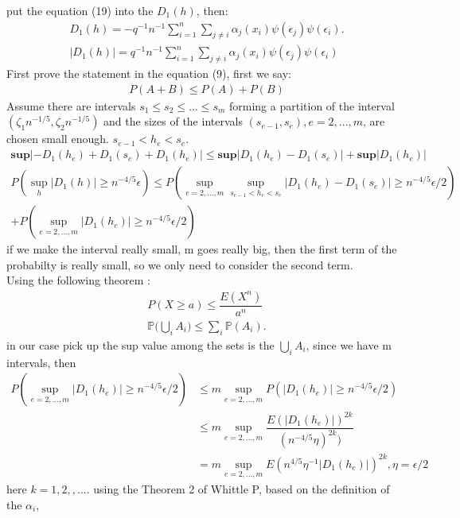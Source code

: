 \documentclass[12pt]{amsart}
\begin{document}
put the equation (19) into the $D_{1}(h)$, then:
\begin{align}
D_{1}(h)=-q^{-1}n^{-1}\sum_{i=1}^{n}\sum_{j\neq i}\alpha_{j}(x_{i})\psi(\epsilon_{j})\psi(\epsilon_{i}).\nonumber\\
|D_{1}(h)|=q^{-1}n^{-1}\sum_{i=1}^{n}\sum_{j\neq i}\alpha_{j}(x_{i})\psi(\epsilon_{j})\psi(\epsilon_{i})
\end{align}
First prove the statement in the equation (9), first we say:
\begin{align}
P(A+B)\leq P(A)+P(B)\nonumber
\end{align}
Assume there are intervals $s_{1}\leq s_{2}\leq...\leq s_{m}$ forming a partition of the interval $(\zeta_{1}n^{-1/5},\zeta_{2}n^{-1/5})$ and the sizes of the intervals $(s_{e-1},s_{e}),e=2,...,m$, are chosen small enough. $s_{e-1}<h_{e}<s_{e}$.
\begin{align}
\textbf{sup}|-D_{1}(h_{e})+D_{1}(s_{e})+D_{1}(h_{e})|\leq \textbf{sup}|D_{1}(h_{e})-D_{1}(s_{e})|+\textbf{sup}|D_{1}(h_{e})| \nonumber\\
P(\sup_{h}|D_{1}(h)|\geq n^{-4/5}\epsilon)\leq P(\sup_{e=2,...,m} \sup_{s_{e-1}<h_{e}<s_{e}}|D_{1}(h_{e})-D_{1}(s_{e})|\geq n^{-4/5}\epsilon/2)\\+P(\sup_{e=2,...,m}|D_{1}(h_{e})|\geq n^{-4/5}\epsilon/2) \nonumber
\end{align}
if we make the interval really small, m goes really big, then the first term of the probabilty is really small, so we only need to consider the second term.\\
Using the following theorem :
\begin{align}
P(X\geq a)\leq \dfrac{E(X^{n})}{a^{n}}\nonumber\\
{\mathbb {P} }{\biggl (}\bigcup _{i}A_{i}{\biggr )}\leq \sum _{i}{\mathbb {P} }(A_{i}).\nonumber
\end{align}
in our case pick up the sup value among the sets is the $\bigcup _{i}A_{i}$, since we have m intervals, then
\begin{align}
P(\sup_{e=2,...,m}|D_{1}(h_{e})|\geq n^{-4/5}\epsilon/2)&\leq m \sup_{e=2,...,m}P(|D_{1}(h_{e})|\geq n^{-4/5}\epsilon/2) \nonumber\\
&\leq m \sup_{e=2,...,m} \dfrac{E(|D_{1}(h_{e})|)^{2k}}{(n^{-4/5}\eta)^{2k})}\\
&=m \sup_{e=2,...,m} E(n^{4/5}\eta^{-1} |D_{1}(h_{e})|)^{2k}, \eta=\epsilon/2 \nonumber
\end{align}
here $k=1,2,,....$
using the Theorem 2 of Whittle P, based on the definition of the $\alpha_{i}$,
\end{document}
